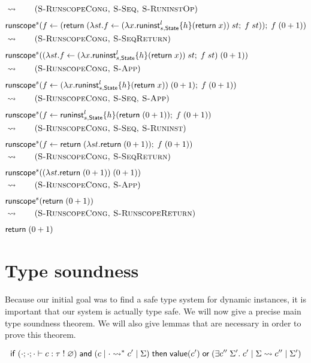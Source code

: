 {\begin{align*}
& \opsem{} \tag{\textsc{S-RunscopeCong, S-Seq, S-RuninstOp}} \\
& \chandlec{s}{\cdo{f}{(\creturn{(\vabs{st}{\cdo{f}{\capp{(\vabs{x}{\chandlei{l}{s,\mathsf{State}}{h}{\creturn{x}}})}{st}}{\capp{f}{st}}})})}{\capp{f}{(0 + 1)}}} \\
& \opsem{} \tag{\textsc{S-RunscopeCong, S-SeqReturn}} \\
& \chandlec{s}{\capp{(\vabs{st}{\cdo{f}{\capp{(\vabs{x}{\chandlei{l}{s,\mathsf{State}}{h}{\creturn{x}}})}{st}}{\capp{f}{st}}})}{(0 + 1)}} \\
& \opsem{} \tag{\textsc{S-RunscopeCong, S-App}} \\
& \chandlec{s}{\cdo{f}{\capp{(\vabs{x}{\chandlei{l}{s,\mathsf{State}}{h}{\creturn{x}}})}{(0 + 1)}}{\capp{f}{(0 + 1)}}} \\
& \opsem{} \tag{\textsc{S-RunscopeCong, S-Seq, S-App}} \\
& \chandlec{s}{\cdo{f}{\chandlei{l}{s,\mathsf{State}}{h}{\creturn{(0 + 1)}}}{\capp{f}{(0 + 1)}}} \\
& \opsem{} \tag{\textsc{S-RunscopeCong, S-Seq, S-Runinst}} \\
& \chandlec{s}{\cdo{f}{\creturn (\vabs{st}{\creturn{(0 + 1)}})}{\capp{f}{(0 + 1)}}} \\
& \opsem{} \tag{\textsc{S-RunscopeCong, S-SeqReturn}} \\
& \chandlec{s}{\capp{(\vabs{st}{\creturn{(0 + 1)}})}{(0 + 1)}} \\
& \opsem{} \tag{\textsc{S-RunscopeCong, S-App}} \\
& \chandlec{s}{\creturn{(0 + 1)}} \\
& \opsem{} \tag{\textsc{S-RunscopeCong, S-RunscopeReturn}} \\
& \creturn{(0 + 1)}
\end{align*}

\section{Type soundness}
\label{sec:theorems}

Because our initial goal was to find a safe type system for dynamic instances, it is important that our system is actually type safe.
We will now give a precise main type soundness theorem.
We will also give lemmas that are necessary in order to prove this theorem.

\begin{theorem}
\[
	\mathsf{if}\;
		(\cdot;\cdot;\cdot \vdash c : \tau \; ! \; \varnothing)
		\;\mathsf{and}\;
		(c \;|\; \cdot \rightsquigarrow^* c' \;|\; \Sigma)
	\;\mathsf{then}\;
		\mathsf{value}(c')
		\;\mathsf{or}\;
		(\exists c'' \; \Sigma'.\; c' \;|\; \Sigma \rightsquigarrow c'' \;|\; \Sigma')
\]
\end{theorem}

}
